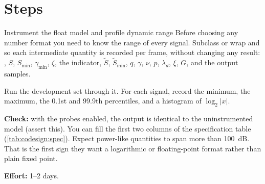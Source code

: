 \section{Steps}\label{sec:codesign:steps}

\begin{stepbox}[label=st:codesign:profile]{Instrument the float model and profile dynamic range}
Before choosing any number format you need to know the range of every signal.
Subclass or wrap  and  so each
intermediate quantity is recorded per frame, without changing any result:
, $S$, $S_\text{min}$, $\gamma_\text{min}$, $\zeta$, the indicator,
$\tilde S$, $\tilde S_\text{min}$, $q$, $\gamma$, $\nu$, $p$, $\lambda_d$, $\xi$,
$G$, and the output samples.

Run the development set through it. For each signal, record the minimum, the
maximum, the 0.1st and 99.9th percentiles, and a histogram of $\log_2|x|$.

\textbf{Check:} with the probes enabled, the output is identical to the
uninstrumented model (assert this). You can fill the first two columns of the
specification table (\cref{tab:codesign:spec}). Expect power-like quantities to
span more than \qty{100}{\dB}. That is the first sign they want a logarithmic
or floating-point format rather than plain fixed point.

\textbf{Effort:} 1--2 days.
\end{stepbox}

